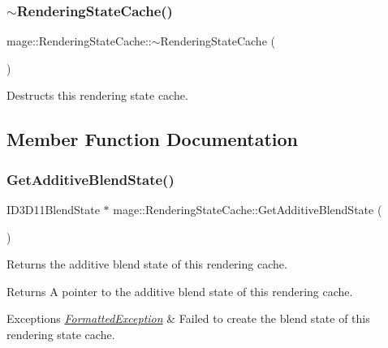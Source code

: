 \subsubsection{\texorpdfstring{$\sim$\+Rendering\+State\+Cache()}{~RenderingStateCache()}}
{\footnotesize\ttfamily mage\+::\+Rendering\+State\+Cache\+::$\sim$\+Rendering\+State\+Cache (\begin{DoxyParamCaption}{ }\end{DoxyParamCaption})\hspace{0.3cm}{\ttfamily [default]}}

Destructs this rendering state cache. 

\subsection{Member Function Documentation}
\hypertarget{structmage_1_1_rendering_state_cache_afa897dcd0b71e4ff8e6ce6d8e31aaa71}{}\label{structmage_1_1_rendering_state_cache_afa897dcd0b71e4ff8e6ce6d8e31aaa71} 
\subsubsection{\texorpdfstring{Get\+Additive\+Blend\+State()}{GetAdditiveBlendState()}}
{\footnotesize\ttfamily I\+D3\+D11\+Blend\+State $\ast$ mage\+::\+Rendering\+State\+Cache\+::\+Get\+Additive\+Blend\+State (\begin{DoxyParamCaption}{ }\end{DoxyParamCaption})}

Returns the additive blend state of this rendering cache.

\begin{DoxyReturn}{Returns}
A pointer to the additive blend state of this rendering cache. 
\end{DoxyReturn}

\begin{DoxyExceptions}{Exceptions}
{\em \hyperlink{structmage_1_1_formatted_exception}{Formatted\+Exception}} & Failed to create the blend state of this rendering state cache. \\
\hline
\end{DoxyExceptions}
\hypertarget{structmage_1_1_rendering_state_cache_a19ad72ad35096722e3d61e58e0ab9205}{}\label{structmage_1_1_rendering_state_cache_a19ad72ad35096722e3d61e58e0ab9205} 
